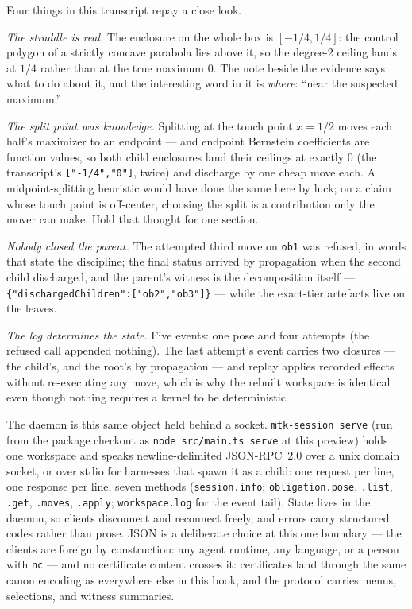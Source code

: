 

Four things in this transcript repay a close look.

\emph{The straddle is real.} The enclosure on the whole box is
$[-1/4, 1/4]$: the control polygon of a strictly concave parabola
lies above it, so the degree-2 ceiling lands at $1/4$ rather than at
the true maximum $0$. The note beside the evidence says what to do
about it, and the interesting word in it is \emph{where}: ``near the
suspected maximum.''

\emph{The split point was knowledge.} Splitting at the touch point
$x = 1/2$ moves each half's maximizer to an endpoint --- and
endpoint Bernstein coefficients are function values, so both child
enclosures land their ceilings at exactly $0$ (the transcript's
\texttt{["-1/4","0"]}, twice) and discharge by one cheap move each.
A midpoint-splitting heuristic would have done the same here by
luck; on a claim whose touch point is off-center, choosing the split
is a contribution only the mover can make. Hold that thought for one
section.

\emph{Nobody closed the parent.} The attempted third move on
\texttt{ob1} was refused, in words that state the discipline; the
final status arrived by propagation when the second child
discharged, and the parent's witness is the decomposition itself ---
\texttt{\{"dischargedChildren":["ob2","ob3"]\}} --- while the
exact-tier artefacts live on the leaves.

\emph{The log determines the state.} Five events: one pose and four attempts
(the refused call appended nothing). The last attempt's event
carries two closures --- the child's, and the root's by propagation
--- and replay applies recorded effects without re-executing any
move, which is why the rebuilt workspace is identical even though
nothing requires a kernel to be deterministic.

The daemon is this same object held behind a socket.
\texttt{mtk-session serve} (run from the package checkout as
\texttt{node src/main.ts serve} at this preview) holds one workspace
and speaks newline-delimited JSON-RPC~2.0 over a unix domain socket,
or over stdio for harnesses that spawn it as a child: one request
per line, one response per line, seven methods
(\texttt{session.info}; \texttt{obligation.pose}, \texttt{.list},
\texttt{.get}, \texttt{.moves}, \texttt{.apply};
\texttt{workspace.log} for the event tail). State lives in the
daemon, so clients disconnect and reconnect freely, and errors carry
structured codes rather than prose. JSON is a deliberate choice at
this one boundary --- the clients are foreign by construction: any
agent runtime, any language, or a person with \texttt{nc} --- and no
certificate content crosses it: certificates land through the same
canon encoding as everywhere else in this book, and the protocol
carries menus, selections, and witness summaries.

